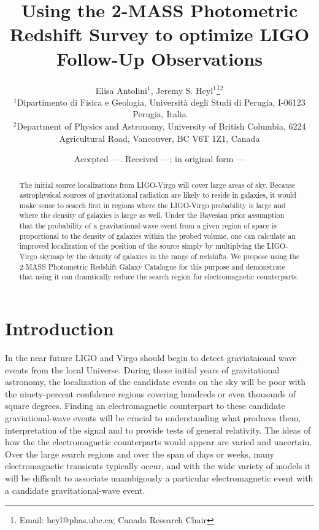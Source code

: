 \documentclass[useAMS,usenatbib]{mn2e}
\title[2MPZ and LIGO]{Using the 2-MASS Photometric Redshift Survey to optimize LIGO Follow-Up Observations}
\author[Antolini \& Heyl]{Elisa Antolini$^{1}$, Jeremy S. Heyl$^{1}$\thanks{Email:
    heyl@phas.ubc.ca; Canada Research Chair}$^{2}$ \\
  $^{1}$Dipartimento di Fisica e Geologia, Universit\`a degli Studi di Perugia, I-06123 Perugia, Italia \\
  $^{2}$Department of Physics and Astronomy, University of British
  Columbia, 6224 Agricultural Road, Vancouver, BC V6T 1Z1, Canada\\
}
\begin{document}
\date{Accepted ---. Received ---; in original form ---}

\pagerange{\pageref{firstpage}--\pageref{lastpage}} 

\maketitle

\label{firstpage}

\begin{abstract}
The initial source localizations from LIGO-Virgo will cover large
areas of sky. Because astrophysical sources of gravitational radiation
are likely to reside in galaxies, it would make sense to search first
in regions where the LIGO-Virgo probability is large and where the
density of galaxies is large as well.  Under the Bayesian prior
assumption that the probability of a gravitational-wave event from a
given region of space is proportional to the density of galaxies
within the probed volume, one can calculate an improved localization
of the position of the source simply by multiplying the LIGO-Virgo
skymap by the density of galaxies in the range of redshifts.  We
propose using the 2-MASS Photometric Redshift Galaxy Catalogue for
this purpose and demonstrate that using it can dramtically reduce the
search region for electromagnetic counterparts.
\end{abstract}

\section{Introduction}

In the near future LIGO and Virgo should begin to detect graviataional
wave events from the local Universe.  During these initial years of
gravitational astronomy, the localization of the candidate events on
the sky will be poor with the ninety-percent confidence regions
covering hundreds or even thousands of square degrees.  Finding an
electromagnetic counterpart to these candidate graviational-wave
events will be crucial to understanding what produces them,
interpretation of the signal and to provide tests of general
relativity.  The ideas of how the the electromagnetic counterparts
would appear are varied and uncertain.  Over the large search regions
and over the span of days or weeks, many electromagnetic transients
typically occur, and with the wide variety of models it will be
difficult to associate unambigously a particular electromagnetic event with
a candidate gravitational-wave event.
\end{document}
